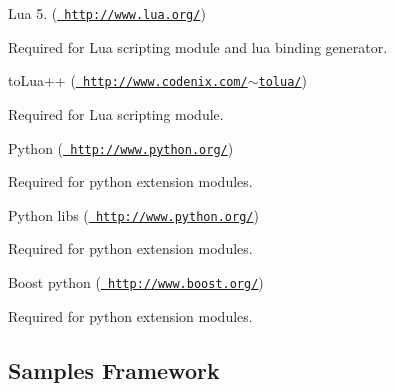 \begin{DoxyItemize}
\item Lua 5. (\href{http://www.lua.org/}{\texttt{ http\+://www.\+lua.\+org/}})
\begin{DoxyItemize}
\item Required for Lua scripting module and lua binding generator.
\end{DoxyItemize}
\item to\+Lua++ (\href{http://www.codenix.com/~tolua/}{\texttt{ http\+://www.\+codenix.\+com/$\sim$tolua/}})
\begin{DoxyItemize}
\item Required for Lua scripting module.
\end{DoxyItemize}
\item Python (\href{http://www.python.org/}{\texttt{ http\+://www.\+python.\+org/}})
\begin{DoxyItemize}
\item Required for python extension modules.
\end{DoxyItemize}
\item Python libs (\href{http://www.python.org/}{\texttt{ http\+://www.\+python.\+org/}})
\begin{DoxyItemize}
\item Required for python extension modules.
\end{DoxyItemize}
\item Boost python (\href{http://www.boost.org/}{\texttt{ http\+://www.\+boost.\+org/}})
\begin{DoxyItemize}
\item Required for python extension modules.
\end{DoxyItemize}
\end{DoxyItemize}\hypertarget{dependencies_dependencies_samples}{}\subsection{Samples Framework}\label{dependencies_dependencies_samples}

